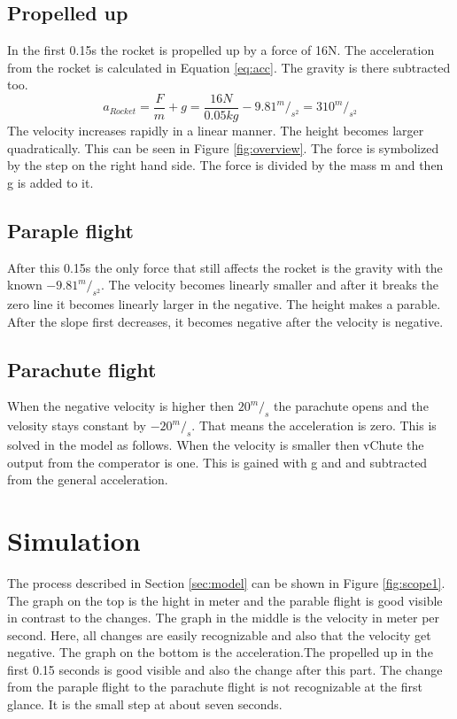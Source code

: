 	

	\subsection{Propelled up}
	In the first 0.15s the rocket is propelled up by a force of 16N. The acceleration from the rocket is calculated in Equation \ref{eq:acc}. The gravity is there subtracted too.
		\begin{equation}
			a_{Rocket} = \frac{F}{m} + g = \frac{16N}{0.05kg} - 9.81^m/_{s^2} = 310^m/_{s^2} \label{eq:acc}
		\end{equation}
	The velocity increases rapidly in a linear manner. The height becomes larger quadratically. This can be seen in Figure \ref{fig:overview}. The force is symbolized by the step on the right hand side. The force is divided by the mass m and then g is added to it.
	
	
	\subsection{Paraple flight}
	After this 0.15s the only force that still affects the rocket is the gravity with the known $-9.81^m/_{s^2}$. 
	The velocity becomes linearly smaller and after it breaks the zero line it becomes linearly larger in the negative. 
	The height makes a parable. After the slope first decreases, it becomes negative after the velocity is negative.
	
	
	\subsection{Parachute flight}
	When the negative velocity is higher then $20^m/_s$ the parachute opens and the velosity stays constant by $-20^m/_s$. That means the acceleration is zero. This is solved in the model as follows. When the velocity is smaller then vChute the output from the comperator is one. This is gained with g and and subtracted from the general acceleration.
	


\section{Simulation}
The process described in Section \ref{sec:model} can be shown in Figure \ref{fig:scope1}. 
The graph on the top is the hight in meter and the parable flight is good visible in contrast to the changes. 
The graph in the middle is the velocity in meter per second. Here, all changes are easily recognizable and also that the velocity get negative.
The graph on the bottom is the acceleration.The propelled up in the first 0.15 seconds is good visible and also the change after this part. The change from the paraple flight to the parachute flight is not recognizable at the first glance. It is the small step at about seven seconds.
	
